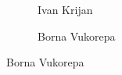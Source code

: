 \begin{frame}[plain]
\begin{figure}[h]
\begin{subfigure}{0.23\textwidth}
	\caption{\scriptsize Ivan Krijan}
	\end{subfigure}
	\begin{subfigure}{0.30\textwidth}
	\captionsetup{labelformat=empty}
	\centering
	\caption{\scriptsize Borna Vukorepa}
	\end{subfigure}
	\end{figure}
\end{frame}





\begin{frame}[plain]
\end{frame}



